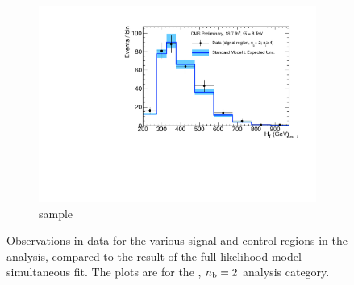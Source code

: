 \begin{figure}[h!]
\begin{subfigure}[b]{0.48\textwidth}
    \includegraphics[width=\textwidth,page=4]
    {Figs/results/v0/blueBand/bestFit_2012dev_RQcdZero_fZinvAll_2b_ge4j-1h_smOnly}
    \caption{\mj sample}
  \end{subfigure}
  \caption{Observations in data for the various signal and control
  regions in the analysis, compared to the result of the full likelihood model
  simultaneous fit. The plots are for the \njhigh, $n_{\text{b}} = 2$ analysis category.}
  \label{fig:blue_fits_2b_ge4j}
\end{figure}


